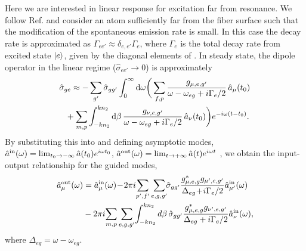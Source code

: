 \documentclass[aps,pra,twocolumn]{revtex4-1} %
\newcommand{\inp}{{\rm in}}
\newcommand{\out}{{\rm out}}
\newcommand{\comment}[1]{{\color{Maroon} #1}}
\begin{document}
Here we are interested in linear response for excitation far from resonance. We follow Ref. \cite{le_kien_propagation_2014} and consider an atom sufficiently far from the fiber surface such that the modification of the spontaneous emission rate is small.   In this case the decay rate is approximated as $\Gamma_{ee'} \approx \delta_{e,e'} \Gamma_{e}$, where $\Gamma_e$ is the total decay rate from excited state $\lvert{e}\rangle$, given by the diagonal elements of .  In steady state, the dipole operator in the linear regime ($\hat{\sigma}_{ee'} \rightarrow 0 $) is approximately
	\begin{align}
		\hat{\sigma}_{ge} &\approx  -\sum_{g'} \hat{\sigma}_{gg'}\int_0^{\infty}\mathrm{d}\omega \bigg(  \sum_{f,p}  
\frac{g_{\mu, e,g'}}{\omega-\omega_{eg} + i \Gamma_{e}/2  }\, \hat{a}_\mu (t_0) \\
	&\!\!\!\! +\sum_{m,p} \int_{-kn_2}^{kn_2}\mathrm{d}\beta \, \frac{g_{\nu, e,g'}}{\omega-\omega_{eg} + i \Gamma_{e}/2 } \,\hat{a}_\nu (t_0)  \bigg)e^{-i\omega (t-t_0)} . \nonumber
	\end{align}
By substituting this into  and defining asymptotic modes, $\hat{a}^{\inp}(\omega) = \lim_{t_0\rightarrow -\infty} \hat{a}(t_0) e^{i\omega t_0}$, $\hat{a}^{\out}(\omega) = \lim_{t\rightarrow +\infty} \hat{a}(t) e^{i\omega t}$ \cite{fan_input-output_2010}, we obtain the input-output relationship for the guided modes,
	\begin{align} \label{Eq::aout}
		\hat{a}^{\out}_\mu (\omega) &= \hat{a}^{\inp}_\mu (\omega) \!-\! 2\pi i\! \sum_{p',f'} 
\sum_{e,g,g'}\!\!\hat{\sigma}_{gg'}\frac{ g_{\mu,e,g}^* g_{\mu',e,g'}}{ \Delta_{eg} \!+\! i \Gamma_{e}/2 }\hat{a}^{\inp}_{\mu'}(\omega) \\
&- 2\pi i\!\sum_{m,p} \sum_{e,g,g'}\! \int^{kn_2}_{-kn_2} d\beta \,\hat{\sigma}_{gg'}\frac{ g_{\mu,e,g}^* g_{\nu',e,g'}}{ \Delta_{eg} + i \Gamma_{e}/2 }\hat{a}^{\inp}_{\nu}(\omega),\nn
	\end{align}
where $\Delta_{eg} = \omega - \omega_{eg}$. 
\end{document}
